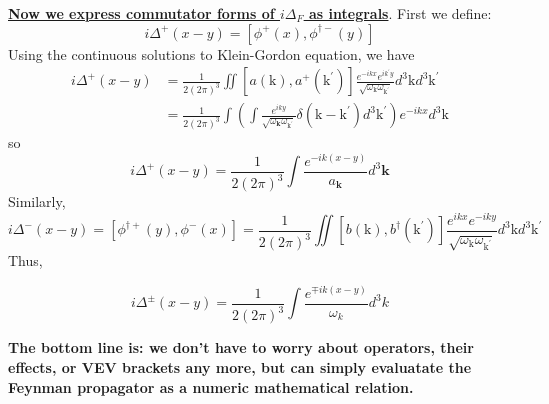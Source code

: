 \underline{\textbf{Now we express commutator forms of $i\Delta_F$ as integrals}}. First we define:
\begin{equation}
i \Delta^{+}(x-y)=\left[\phi^{+}(x), \phi^{\dagger-}(y)\right]
\end{equation}
Using the continuous solutions to Klein-Gordon equation, we have
$$
\begin{aligned}
i \Delta^{+}(x-y) &=\frac{1}{2(2 \pi)^{3}} \iint\left[a(\mathrm{k}), a^{+}\left(\mathrm{k}^{\prime}\right)\right] \frac{e^{-i k x} e^{i k^{\prime} y}}{\sqrt{\omega_{\mathrm{k}} \omega_{\mathrm{k}^{\prime}}}} d^{3} \mathrm{k} d^{3} \mathrm{k}^{\prime} \\
&=\frac{1}{2(2 \pi)^{3}} \int\left(\int \frac{e^{i k y}}{\sqrt{\omega_{\mathbf{k}} \omega_{\mathrm{k}^{\prime}}}} \delta\left(\mathrm{k}-\mathrm{k}^{\prime}\right) d^{3} \mathrm{k}^{\prime}\right) e^{-i k x} d^{3} \mathrm{k}
\end{aligned}
$$
so
\begin{equation}
i \Delta^{+}(x-y)=\frac{1}{2(2 \pi)^{3}} \int \frac{e^{-i k(x-y)}}{a_{\mathbf{k}}} d^{3} \mathbf{k}
\end{equation}
Similarly,
$$
i \Delta^{-}(x-y)=\left[\phi^{\dagger+}(y), \phi^{-}(x)\right]=\frac{1}{2(2 \pi)^{3}} \iint\left[b(\mathrm{k}), b^{\dagger}\left(\mathrm{k}^{\prime}\right)\right] \frac{e^{i k x} e^{-i k y}}{\sqrt{\omega_{\mathrm{k}} \omega_{\mathrm{k}^{\prime}}}} d^{3} \mathrm{k} d^{3} \mathrm{k}^{\prime}
$$
Thus,
\begin{qt}
    \begin{equation}
i \Delta^{\pm}(x-y)=\frac{1}{2(2 \pi)^{3}} \int \frac{e^{\mp i k(x-y)}}{\omega_{k}} d^{3} k
\end{equation}
\end{qt}
\textbf{The bottom line is: we don't have to worry about operators, their effects, or VEV brackets any more, but can simply evaluatate the Feynman propagator as a numeric mathematical relation.}

